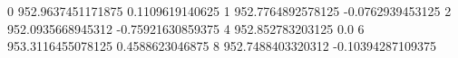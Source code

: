 0 952.9637451171875 0.1109619140625
1 952.7764892578125 -0.0762939453125
2 952.0935668945312 -0.75921630859375
4 952.852783203125 0.0
6 953.3116455078125 0.4588623046875
8 952.7488403320312 -0.10394287109375
